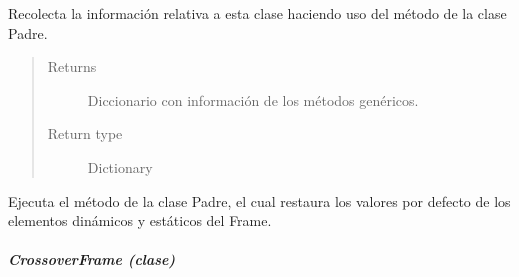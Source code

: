 \documentclass[letterpaper,10pt,english]{sphinxmanual}
\begin{document}
\begin{fulllineitems}
\begin{fulllineitems}
\label{View/Main/GeneticOperator/TemplateGeneticOperator/SelectionFrame:View.Main.GeneticOperator.SelectionFrame.SelectionFrame.get_information}
Recolecta la información relativa a esta clase haciendo uso del método
de la clase Padre.
\begin{quote}\begin{description}
\item[{Returns}] \leavevmode
Diccionario con información de los métodos genéricos.

\item[{Return type}] \leavevmode
Dictionary

\end{description}\end{quote}

\end{fulllineitems}


\begin{fulllineitems}
\label{View/Main/GeneticOperator/TemplateGeneticOperator/SelectionFrame:View.Main.GeneticOperator.SelectionFrame.SelectionFrame.restore_settings}
Ejecuta el método de la clase Padre, el cual restaura los valores por 
defecto de los elementos dinámicos y estáticos del Frame.

\end{fulllineitems}


\end{fulllineitems}



\subparagraph{CrossoverFrame (clase)}
\label{View/Main/GeneticOperator/TemplateGeneticOperator/CrossoverFrame:module-View.Main.GeneticOperator.CrossoverFrame}\label{View/Main/GeneticOperator/TemplateGeneticOperator/CrossoverFrame:crossoverframe-clase}\label{View/Main/GeneticOperator/TemplateGeneticOperator/CrossoverFrame::doc}
\end{document}
